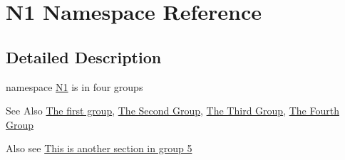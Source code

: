 \hypertarget{namespaceN1}{\section{N1 Namespace Reference}
\label{namespaceN1}
}


\subsection{Detailed Description}
namespace \hyperlink{namespaceN1}{N1} is in four groups \begin{DoxySeeAlso}{See Also}
\hyperlink{group__group1}{The first group}, \hyperlink{group__group2}{The Second Group}, \hyperlink{group__group3}{The Third Group}, \hyperlink{group__group4}{The Fourth Group}
\end{DoxySeeAlso}
Also see \hyperlink{group__group5}{This is another section in group 5} 